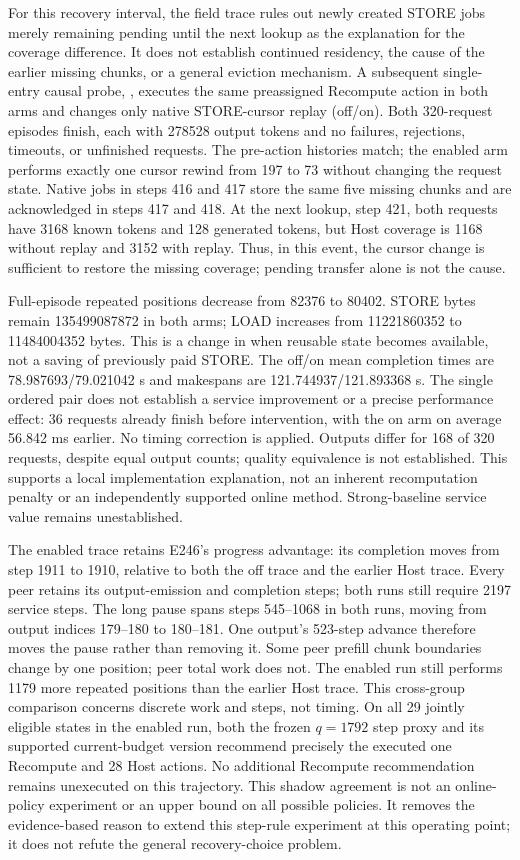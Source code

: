 \documentclass[10pt,a4paper]{article}
\begin{document}
For this recovery interval, the field trace rules out newly created STORE jobs
merely remaining pending until the next lookup as the explanation for the
coverage difference. It does not establish continued residency, the cause of
the earlier missing chunks, or a general eviction mechanism. A subsequent single-entry causal probe, ,
executes the same preassigned Recompute action in both arms and changes only
native STORE-cursor replay (off/on). Both 320-request episodes finish, each
with 278528 output tokens and no failures, rejections, timeouts, or unfinished
requests. The pre-action histories match; the enabled arm performs exactly
one cursor rewind from 197 to 73 without changing the request state. Native
jobs in steps 416 and 417 store the same five missing chunks and are
acknowledged in steps 417 and 418. At the next lookup, step 421, both requests
have 3168 known tokens and 128 generated tokens, but Host coverage is 1168
without replay and 3152 with replay. Thus, in this event, the cursor change
is sufficient to restore the missing coverage; pending transfer alone is not
the cause.

Full-episode repeated positions decrease from 82376 to 80402. STORE bytes
remain 135499087872 in both arms; LOAD increases from 11221860352 to
11484004352 bytes. This is a change in when reusable state becomes available,
not a saving of previously paid STORE. The off/on mean completion times are
78.987693/79.021042 s and makespans are 121.744937/121.893368 s. The single
ordered pair does not establish a service improvement or a precise performance
effect: 36 requests already finish before intervention, with the on arm on
average 56.842 ms earlier. No timing correction is applied. Outputs differ
for 168 of 320 requests, despite equal output counts; quality equivalence is
not established. This supports a local implementation explanation, not an
inherent recomputation penalty or an independently supported online method.
Strong-baseline service value remains unestablished.

The enabled trace retains E246's progress advantage: its completion moves
from step 1911 to 1910, relative to both the off trace and the earlier Host
trace. Every peer retains its output-emission and completion steps; both
runs still require 2197 service steps. The long pause spans steps 545--1068
in both runs, moving from output indices 179--180 to 180--181. One output's
523-step advance therefore moves the pause rather than removing it. Some
peer prefill chunk boundaries change by one position; peer total work does
not. The enabled run still performs 1179 more repeated positions than the
earlier Host trace. This cross-group comparison concerns discrete work and
steps, not timing. On all 29 jointly eligible states in the enabled run,
both the frozen $q=1792$ step proxy and its supported current-budget version
recommend precisely the executed one Recompute and 28 Host actions. No
additional Recompute recommendation remains unexecuted on this trajectory.
This shadow agreement is not an online-policy experiment or an upper bound
on all possible policies. It removes the evidence-based reason to extend
this step-rule experiment at this operating point; it does not refute the
general recovery-choice problem.
\end{document}
